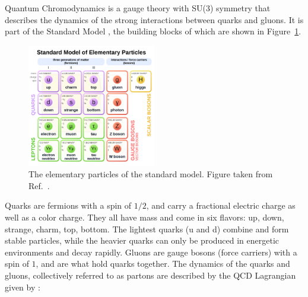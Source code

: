 Quantum Chromodynamics is a gauge theory with SU(3) symmetry that describes the dynamics of the strong interactions between quarks and gluons.
It is part of the Standard Model \cite{Gaillard:1998ui}, the building blocks of which are shown in Figure~\ref{fig:sm_particles}.


\begin{figure}[htbp]
\begin{center}
\includegraphics[width=0.5\textwidth]{figures/theory/SM}
\caption{The elementary particles of the standard model.
Figure taken from Ref.~\cite{SMpict}.}
\label{fig:sm_particles}
\end{center}
\end{figure}


Quarks are fermions with a spin of $1/2$, and carry a fractional electric charge as well as a color charge.
They all have mass and come in six flavors: up, down, strange, charm, top, bottom.
The lightest quarks (u and d) combine and form stable particles, while the heavier quarks can only be produced in energetic environments and decay rapidly.
Gluons are gauge bosons (force carriers) with a spin of $1$, and are what hold quarks together.
The dynamics of the quarks and gluons, collectively referred to as partons are described by the QCD Lagrangian given by \cite{Beringer:1481544}:

